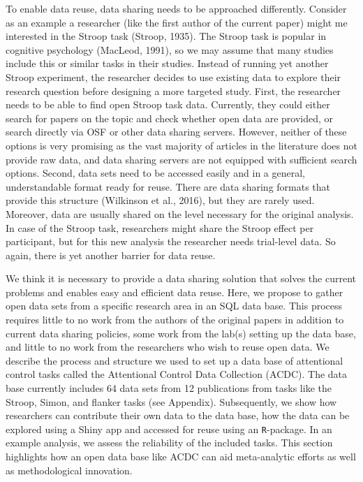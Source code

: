 \documentclass[
  man,floatsintext]{apa6}
\begin{document}
To enable data reuse, data sharing needs to be approached differently. Consider as an example a researcher (like the first author of the current paper) might me interested in the Stroop task (Stroop, 1935). The Stroop task is popular in cognitive psychology (MacLeod, 1991), so we may assume that many studies include this or similar tasks in their studies. Instead of running yet another Stroop experiment, the researcher decides to use existing data to explore their research question before designing a more targeted study. First, the researcher needs to be able to find open Stroop task data. Currently, they could either search for papers on the topic and check whether open data are provided, or search directly via OSF or other data sharing servers. However, neither of these options is very promising as the vast majority of articles in the literature does not provide raw data, and data sharing servers are not equipped with sufficient search options. Second, data sets need to be accessed easily and in a general, understandable format ready for reuse. There are data sharing formats that provide this structure (Wilkinson et al., 2016), but they are rarely used. Moreover, data are usually shared on the level necessary for the original analysis. In case of the Stroop task, researchers might share the Stroop effect per participant, but for this new analysis the researcher needs trial-level data. So again, there is yet another barrier for data reuse.

We think it is necessary to provide a data sharing solution that solves the current problems and enables easy and efficient data reuse. Here, we propose to gather open data sets from a specific research area in an SQL data base. This process requires little to no work from the authors of the original papers in addition to current data sharing policies, some work from the lab(s) setting up the data base, and little to no work from the researchers who wish to reuse open data. We describe the process and structure we used to set up a data base of attentional control tasks called the Attentional Control Data Collection (ACDC). The data base currently includes 64 data sets from 12 publications from tasks like the Stroop, Simon, and flanker tasks (see Appendix). Subsequently, we show how researchers can contribute their own data to the data base, how the data can be explored using a Shiny app and accessed for reuse using an \texttt{R}-package. In an example analysis, we assess the reliability of the included tasks. This section highlights how an open data base like ACDC can aid meta-analytic efforts as well as methodological innovation.
\end{document}
